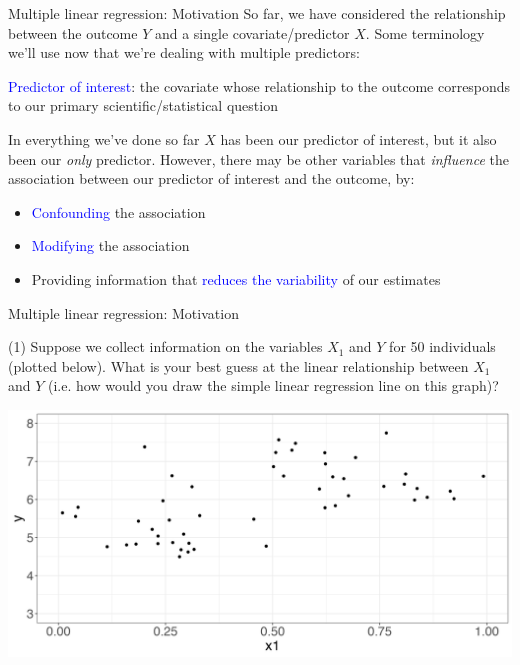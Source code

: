 \documentclass[10pt,t]{beamer}
\begin{document}
\begin{frame}{Multiple linear regression: Motivation}
So far, we have considered the relationship between the outcome $Y$ and a single covariate/predictor $X$. Some terminology we'll use now that we're dealing with multiple predictors:

\vspace{0.3cm}

\textcolor{blue}{Predictor of interest}: the covariate whose relationship to the outcome corresponds to our primary scientific/statistical question \pause

\vspace{0.3cm}

In everything we've done so far $X$ has been our predictor of interest, but it also been our \textit{only} predictor. However, there may be other variables that \textit{influence} the association between our predictor of interest and the outcome, by:

\vspace{0.3cm}

\begin{itemize}
	\item \textcolor{blue}{Confounding} the association
	\item \textcolor{blue}{Modifying} the association
	\item Providing information that \textcolor{blue}{reduces the variability} of our estimates
\end{itemize}

\end{frame}

\begin{frame}{Multiple linear regression: Motivation}
	\vspace{-5 mm}
	
(1) Suppose we collect information on the variables $X_1$ and $Y$ for 50 individuals (plotted below). What is your best guess at the linear relationship between $X_1$ and $Y$ (i.e. how would you draw the simple linear regression line on this graph)?

\vspace{0.3cm}

\centering \includegraphics[scale=0.4]{figures/multreg1.png}
\end{frame}
\end{document}
